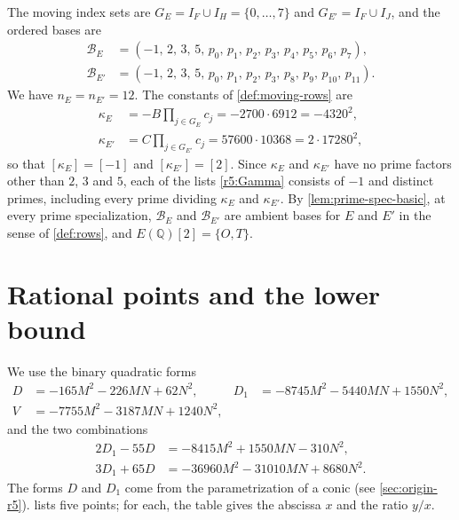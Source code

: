 \documentclass[12pt,oneside,openany]{book}
\theoremstyle{definition}
\theoremstyle{plain}
\numberwithin{equation}{chapter}
\theoremstyle{plain}
\theoremstyle{definition}
\theoremstyle{remark}
\newcommand{\Q}{\mathbb Q}
\newcommand{\sq}[1]{[#1]}
\newcommand{\cB}{\mathcal B}
\begin{document}
The moving index sets are $G_E=I_F\cup I_H=\{0,\dots,7\}$ and $G_{E'}=I_F\cup I_J$, and the ordered bases are
\begin{equation}\label{r5:bases}
\begin{aligned}
\cB_E&=(-1,\,2,\,3,\,5,\,p_0,\,p_1,\,p_2,\,p_3,\,p_4,\,p_5,\,p_6,\,p_7),\\
\cB_{E'}&=(-1,\,2,\,3,\,5,\,p_0,\,p_1,\,p_2,\,p_3,\,p_8,\,p_9,\,p_{10},\,p_{11}).
\end{aligned}
\end{equation}
We have $n_E=n_{E'}=12$. The constants of \cref{def:moving-rows} are
\begin{equation}\label{r5:kappa}
\begin{aligned}
\kappa_E&=-B\prod_{j\in G_E}c_j=-2700\cdot6912=-4320^2,\\
\kappa_{E'}&=C\prod_{j\in G_{E'}}c_j=57600\cdot10368=2\cdot17280^2,
\end{aligned}
\end{equation}
so that $\sq{\kappa_E}=\sq{-1}$ and $\sq{\kappa_{E'}}=\sq{2}$. Since $\kappa_E$ and $\kappa_{E'}$ have no prime factors other than $2$, $3$ and $5$, each of the lists \eqref{r5:Gamma} consists of $-1$ and distinct primes, including every prime dividing $\kappa_E$ and $\kappa_{E'}$. By \cref{lem:prime-spec-basic}, at every prime specialization, $\cB_E$ and $\cB_{E'}$ are ambient bases for $E$ and $E'$ in the sense of \cref{def:rows}, and $E(\Q)[2]=\{O,T\}$.

\section{Rational points and the lower bound}\label{sec:r5-points}

We use the binary quadratic forms
\begin{equation}\label{r5:quadratics}
\begin{aligned}
D&=-165M^2-226MN+62N^2, & D_1&=-8745M^2-5440MN+1550N^2,\\
V&=-7755M^2-3187MN+1240N^2, &&
\end{aligned}
\end{equation}
and the two combinations
\[
\begin{aligned}
2D_1-55D&=-8415M^2+1550MN-310N^2,\\
3D_1+65D&=-36960M^2-31010MN+8680N^2.
\end{aligned}
\]
The forms $D$ and $D_1$ come from the parametrization of a conic (see \cref{sec:origin-r5}).  lists five points; for each, the table gives the abscissa $x$ and the ratio $y/x$.
\end{document}
